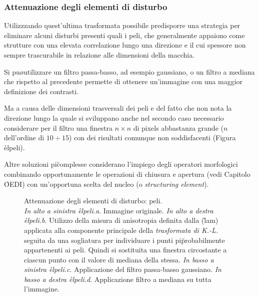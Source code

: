 \subsubsection{Attenuazione degli elementi di disturbo}

Utilizzzando quest'ultima trasformata \e possibile predisporre una strategia per eliminare
alcuni disturbi presenti quali i peli, che generalmente appaiono come strutture con una
elevata correlazione lungo una direzione e il cui spessore non \e sempre trascurabile in 
relazione alle dimensioni della macchia.

Si pu\o utilizzare un filtro passa-basso, ad esempio gaussiano, o un
filtro a mediana che rispetto al precedente permette di ottenere un'immagine con una maggior
definizione dei contrasti.

Ma a causa delle dimensioni trasversali dei peli e del fatto che non \e nota la direzione lungo
la quale si sviluppano anche nel secondo caso \e necessario considerare per il filtro una
finestra $n \times n$ di pixels abbastanza grande ($n$ dell'ordine di $10 \div 15$) con
dei risultati comunque non soddisfacenti (Figura \r{elpeli}).

Altre soluzioni pi\u complesse considerano l'impiego degli operatori morfologici
\cite{Schmid} combinando opportunamente le operazioni di chiusura e apertura (vedi Capitolo
\r{OEDI}) con un'opportuna scelta del nucleo (o {\it structuring element}).

\begin{figure}[tbp]
 \centerline{
  \hfill
  }
 \centerline{
  \hfill
  }
 \caption[Attenuazione degli elementi di disturbo: peli]
  {Attenuazione degli elementi di disturbo: peli.\\
   {\sl In alto a sinistra \r{elpeli}.a}. Immagine originale.
   {\sl In alto a destra \r{elpeli}.b}. Utilizzo della
   misura di anisotropia definita dalla (\r{lam}) applicata alla componente principale della
   {\it trasformata di K.-L.} seguita da una sogliatura per individuare i punti pi\u probabilmente
   appartenenti ai peli. Quindi si \e sostituita una finestra circostante a ciascun punto con
   il valore di mediana della stessa.
   {\sl In basso a sinistra \r{elpeli}.c}. Applicazione del filtro passa-basso gaussiano.
   {\sl In basso a destra \r{elpeli}.d}. Applicazione filtro a mediana su tutta l'immagine.}
\end{figure}

